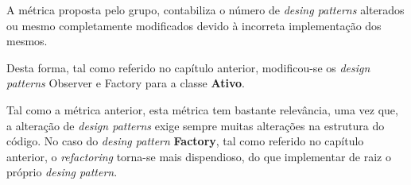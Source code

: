 \hspace{5mm} A métrica proposta pelo grupo, contabiliza o número de \emph{desing patterns} alterados ou mesmo completamente modificados devido à incorreta implementação dos mesmos.

\hspace{5mm} Desta forma, tal como referido no capítulo anterior, modificou-se os \emph{design patterns} Observer e Factory para a classe \textbf{Ativo}.

\hspace{5mm} Tal como a métrica anterior, esta métrica tem bastante relevância, uma vez que, a alteração de \emph{design patterns} exige sempre muitas alterações na estrutura do código. No caso do \emph{desing pattern} \textbf{Factory}, tal como referido no capítulo anterior, o \emph{refactoring} torna-se mais dispendioso, do que implementar de raiz o próprio \emph{desing pattern}.